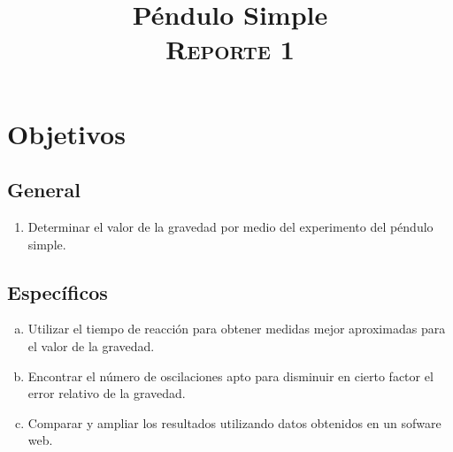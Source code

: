 \documentclass[conference]{IEEEtran}
\begin{document}
\title{Péndulo Simple\\
{\footnotesize \scshape{Reporte 1}}
}

\author{
}

\maketitle

\begin{abstract}
    
\end{abstract}

\begin{IEEEkeywords}
    
\end{IEEEkeywords}

\section{Objetivos}

\subsection{General}
    \begin{enumerate}[1.]
        \item Determinar el valor de la gravedad por medio del experimento del péndulo simple.
    \end{enumerate}
\subsection{Específicos}
    \begin{enumerate}[a)]
        \item Utilizar el tiempo de reacción para obtener medidas mejor aproximadas para el valor de la gravedad.
        \item Encontrar el número de oscilaciones apto para disminuir en cierto factor el error relativo de la gravedad.
        \item Comparar y ampliar los resultados utilizando datos obtenidos en un sofware web.
    \end{enumerate}

    
\end{document}
